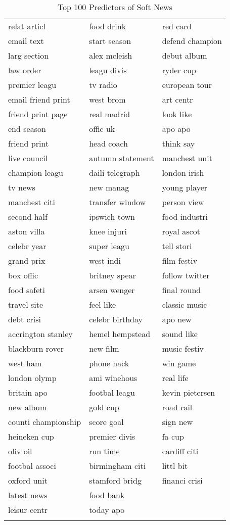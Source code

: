 \begingroup\small
\begin{longtable}{p{}p{}p{}}
\caption{Top 100 Predictors of Soft News} \\ 
  \hline
  \hline
relat articl & food drink & red card \\ 
  email text & start season & defend champion \\ 
  larg section & alex mcleish & debut album \\ 
  law order & leagu divis & ryder cup \\ 
  premier leagu & tv radio & european tour \\ 
  email friend print & west brom & art centr \\ 
  friend print page & real madrid & look like \\ 
  end season & offic uk & apo apo \\ 
  friend print & head coach & think say \\ 
  live council & autumn statement & manchest unit \\ 
  champion leagu & daili telegraph & london irish \\ 
  tv news & new manag & young player \\ 
  manchest citi & transfer window & person view \\ 
  second half & ipswich town & food industri \\ 
  aston villa & knee injuri & royal ascot \\ 
  celebr year & super leagu & tell stori \\ 
  grand prix & west indi & film festiv \\ 
  box offic & britney spear & follow twitter \\ 
  food safeti & arsen wenger & final round \\ 
  travel site & feel like & classic music \\ 
  debt crisi & celebr birthday & apo new \\ 
  accrington stanley & hemel hempstead & sound like \\ 
  blackburn rover & new film & music festiv \\ 
  west ham & phone hack & win game \\ 
  london olymp & ami winehous & real life \\ 
  britain apo & footbal leagu & kevin pietersen \\ 
  new album & gold cup & road rail \\ 
  counti championship & score goal & sign new \\ 
  heineken cup & premier divis & fa cup \\ 
  oliv oil & run time & cardiff citi \\ 
  footbal associ & birmingham citi & littl bit \\ 
  oxford unit & stamford bridg & financi crisi \\ 
  latest news & food bank &  \\ 
  leisur centr & today apo &  \\ 
   \hline
\hline
\label{tab:top_100_soft}
\end{longtable}
\endgroup
